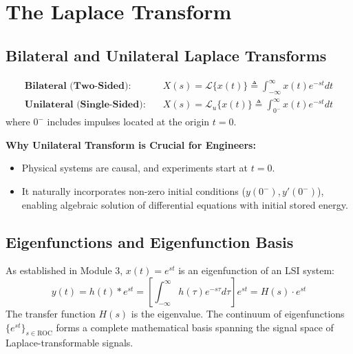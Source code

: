 \documentclass[12pt,a4paper]{article}
\begin{document}
\section{The Laplace Transform}

\subsection{Bilateral and Unilateral Laplace Transforms}

\begin{tcolorbox}[defbox, title={\textbf{Definition: Bilateral vs Unilateral Laplace Transform}}]
\begin{align}
  \textbf{Bilateral (Two-Sided):} \quad &X(s) = \mathcal{L}\{x(t)\} \triangleq \int_{-\infty}^{\infty} x(t) e^{-st} dt \\
  \textbf{Unilateral (Single-Sided):} \quad &X(s) = \mathcal{L}_u\{x(t)\} \triangleq \int_{0^-}^{\infty} x(t) e^{-st} dt
\end{align}
where $0^-$ includes impulses located at the origin $t=0$.
\end{tcolorbox}

\textbf{Why Unilateral Transform is Crucial for Engineers:}
\begin{itemize}[topsep=2pt, itemsep=2pt]
  \item Physical systems are causal, and experiments start at $t=0$.
  \item It naturally incorporates non-zero initial conditions ($y(0^-), y'(0^-)$), enabling algebraic solution of differential equations with initial stored energy.
\end{itemize}

\subsection{Eigenfunctions and Eigenfunction Basis}
As established in Module 3, $x(t) = e^{st}$ is an eigenfunction of an LSI system:
\begin{equation}
  y(t) = h(t) * e^{st} = \left[ \int_{-\infty}^{\infty} h(\tau) e^{-s\tau} d\tau \right] e^{st} = H(s) \cdot e^{st}
\end{equation}
The transfer function $H(s)$ is the eigenvalue. The continuum of eigenfunctions $\{e^{st}\}_{s \in \text{ROC}}$ forms a complete mathematical basis spanning the signal space of Laplace-transformable signals.
\end{document}
